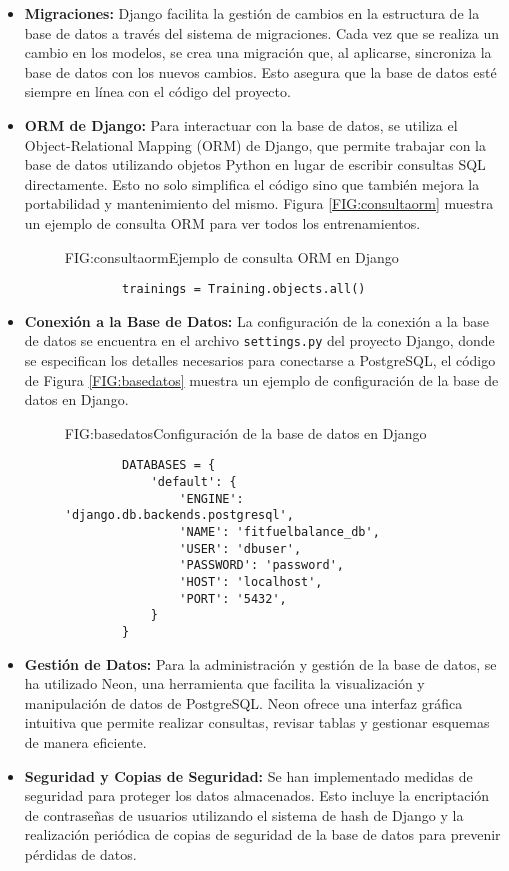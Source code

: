 \begin{itemize}
    \item \textbf{Migraciones:} Django facilita la gestión de cambios en la estructura de la base de datos a través del sistema de migraciones. Cada vez que se realiza un cambio en los modelos, se crea una migración que, al aplicarse, sincroniza la base de datos con los nuevos cambios. Esto asegura que la base de datos esté siempre en línea con el código del proyecto.

    \item \textbf{ORM de Django:} Para interactuar con la base de datos, se utiliza el Object-Relational Mapping (ORM) de Django, que permite trabajar con la base de datos utilizando objetos Python en lugar de escribir consultas SQL directamente. Esto no solo simplifica el código sino que también mejora la portabilidad y mantenimiento del mismo. Figura \ref{FIG:consultaorm} muestra un ejemplo de consulta ORM para ver todos los entrenamientos.
    \begin{figure}[Ejemplo Consulta ORM]{FIG:consultaorm}{Ejemplo de consulta ORM en Django}
    \begin{verbatim}
        trainings = Training.objects.all()
    \end{verbatim}
    \end{figure}

    \item \textbf{Conexión a la Base de Datos:} La configuración de la conexión a la base de datos se encuentra en el archivo \texttt{settings.py} del proyecto Django, donde se especifican los detalles necesarios para conectarse a PostgreSQL, el código de Figura \ref{FIG:basedatos} muestra un ejemplo de configuración de la base de datos en Django.
    \begin{figure}[Configuración Base de Datos]{FIG:basedatos}{Configuración de la base de datos en Django}
    \begin{verbatim}
        DATABASES = {
            'default': {
                'ENGINE': 'django.db.backends.postgresql',
                'NAME': 'fitfuelbalance_db',
                'USER': 'dbuser',
                'PASSWORD': 'password',
                'HOST': 'localhost',
                'PORT': '5432',
            }
        }
    \end{verbatim}
    \end{figure}

    \item \textbf{Gestión de Datos:} Para la administración y gestión de la base de datos, se ha utilizado Neon, una herramienta que facilita la visualización y manipulación de datos de PostgreSQL. Neon ofrece una interfaz gráfica intuitiva que permite realizar consultas, revisar tablas y gestionar esquemas de manera eficiente.

    \item \textbf{Seguridad y Copias de Seguridad:} Se han implementado medidas de seguridad para proteger los datos almacenados. Esto incluye la encriptación de contraseñas de usuarios utilizando el sistema de hash de Django y la realización periódica de copias de seguridad de la base de datos para prevenir pérdidas de datos.
\end{itemize}

